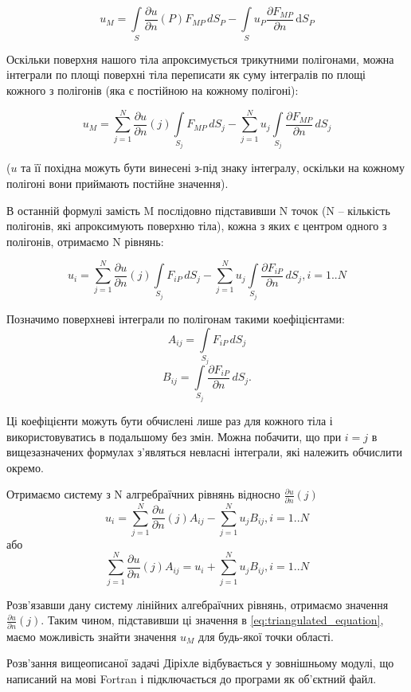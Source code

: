 \documentclass[a4paper,12pt]{article}
\begin{document}
\[
u_M = \int\limits_S \frac{\partial u}{\partial n}(P) F_{MP} \, d S_P - \int\limits_S u_P \frac{\partial F_{MP}}{\partial n} \, \mathrm{d}S_P
\]

Оскільки поверхня нашого тіла апроксимується трикутними полігонами, можна інтеграли по площі поверхні тіла переписати як суму інтегралів по площі кожного з полігонів (яка є постійною на кожному полігоні):

\begin{equation} \label{eq:triangulated_equation}
u_M = \sum_{j=1}^{N} \frac{\partial u}{\partial n}(j) \int\limits_{S_j} F_{MP} \, dS_j - \sum_{j=1}^{N} u_j \int\limits_{S_j} \frac{\partial F_{MP}}{\partial n} \, dS_j
\end{equation}

($u$ та її похідна можуть бути винесені з-під знаку інтегралу, оскільки на кожному полігоні вони приймають постійне значення).

В останній формулі замість M послідовно підставивши N точок (N -- кількість полігонів, які апроксимують поверхню тіла), кожна з яких є центром одного з полігонів, отримаємо N рівнянь:

\[
u_i = \sum_{j=1}^{N} \frac{\partial u}{\partial n}(j) \int\limits_{S_j} F_{iP} \, dS_j - \sum_{j=1}^{N} u_j \int\limits_{S_j} \frac{\partial F_{iP}}{\partial n} \, dS_j, i = 1..N
\]

Позначимо поверхневі інтеграли по полігонам такими коефіцієнтами:
\[A_{ij} = \int\limits_{S_j} F_{iP} \, dS_j\]
\[B_{ij} = \int\limits_{S_j} \frac{\partial F_{iP}}{\partial n} \, dS_j.\]

Ці коефіцієнти можуть бути обчислені лише раз для кожного тіла і використовуватись в подальшому без змін. Можна побачити, що при $i = j$ в вищезазначених формулах з’являться невласні інтеграли, які належить обчислити окремо.

Отримаємо систему з N алгребраїчних рівнянь відносно $\frac{\partial u}{\partial n}(j)$
\[
u_i = \sum_{j=1}^{N} \frac{\partial u}{\partial n}(j) A_{ij} - \sum_{j=1}^{N} u_j B_{ij}, i = 1..N
\]
або
\[
\sum_{j=1}^{N} \frac{\partial u}{\partial n}(j) A_{ij} = u_i + \sum_{j=1}^{N} u_j B_{ij}, i = 1..N
\]

Розв’язавши дану систему лінійних алгебраїчних рівнянь, отримаємо значення $\frac{\partial u}{\partial n}(j)$. Таким чином, підставивши ці значення в \ref{eq:triangulated_equation}, маємо можливість знайти значення $u_M$ для будь-якої точки області.

Розв’зання вищеописаної задачі Діріхле відбувається у зовнішньому модулі, що написаний на мові Fortran і підключається до програми як об’єктний файл.
\end{document}
